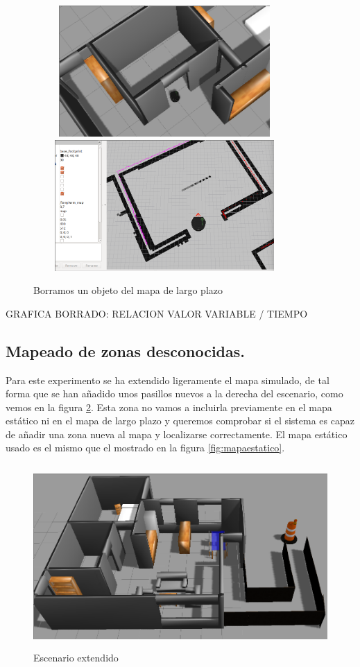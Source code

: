 \begin{figure}[hbtp]
  \begin{center}
    \includegraphics[width=10cm,height=5cm]{img/cap7/deletingobject-gazebo}
    \includegraphics[width=10cm,height=5cm]{img/cap7/deletingobject-longmap}
  \end{center}
  \caption{Borramos un objeto del mapa de largo plazo}
  \label{fig:deleteobjectlongmap}
\end{figure}

GRAFICA BORRADO: RELACION VALOR VARIABLE / TIEMPO

\subsection {Mapeado de zonas desconocidas.}
Para este experimento se ha extendido ligeramente el mapa simulado, de tal forma que se han añadido unos pasillos nuevos a la derecha del escenario, como vemos en la figura \ref{fig:grannieAnne-ext}. Esta zona no vamos a incluirla previamente en el mapa estático ni en el mapa de largo plazo y queremos comprobar si el sistema es capaz de añadir una zona nueva al mapa y localizarse correctamente. El mapa estático usado es el mismo que el mostrado en la figura \ref{fig:mapaestatico}.
\begin{figure}[H]
  \begin{center}
    \includegraphics[width=12cm,height=7cm]{img/cap7/grannieAnne-ext}
  \end{center}
  \caption{Escenario extendido}
  \label{fig:grannieAnne-ext}
\end{figure}

